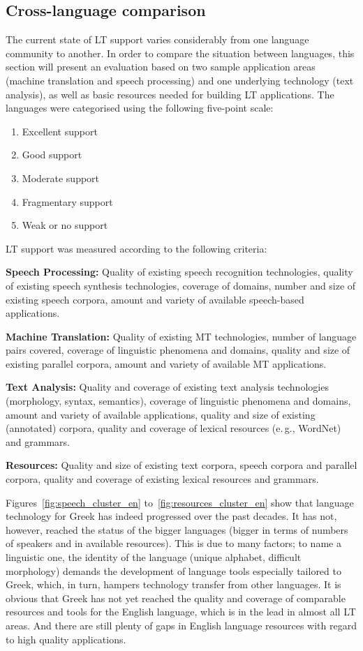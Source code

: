 \begin{multicols}{2}
\subsection{Cross-language comparison}

The current state of LT support varies considerably from one language community to another. In order to compare the situation between languages, this section will present an evaluation based on two sample application areas (machine translation and speech processing) and one underlying technology (text analysis), as well as basic resources needed for building LT applications. The languages were categorised using the following five-point scale: 

\begin{enumerate}
\item Excellent support
\item Good support
\item Moderate support
\item Fragmentary support
\item Weak or no support
\end{enumerate}

LT support was measured according to the following criteria:

\textbf{Speech Processing:} Quality of existing speech recognition technologies, quality of existing speech synthesis technologies, coverage of domains, number and size of existing speech corpora, amount and variety of available speech-based applications.

\textbf{Machine Translation:} Quality of existing MT technologies, number of language pairs covered, coverage of linguistic phenomena and domains, quality and size of existing parallel corpora, amount and variety of available MT applications.

\textbf{Text Analysis:} Quality and coverage of existing text analysis technologies (morphology, syntax, semantics), coverage of linguistic phenomena and domains, amount and variety of available applications, quality and size of existing (annotated) corpora, quality and coverage of lexical resources (e.\,g., WordNet) and grammars.

\textbf{Resources:} Quality and size of existing text corpora, speech corpora and parallel corpora, quality and coverage of existing lexical resources and grammars.

Figures~\ref{fig:speech_cluster_en} to~\ref{fig:resources_cluster_en} show that language technology for Greek has indeed progressed over the past decades. It has not, however, reached the status of the bigger languages (bigger in terms of numbers of speakers and in available resources). This is due to many factors; to name a linguistic one, the identity of the language (unique alphabet, difficult morphology) demands the development of language tools especially tailored to Greek, which, in turn, hampers technology transfer from other languages. It is obvious that Greek has not yet reached the quality and coverage of comparable resources and tools for the English language, which is in the lead in almost all LT areas. And there are still plenty of gaps in English language resources with regard to high quality applications.


\end{multicols}
